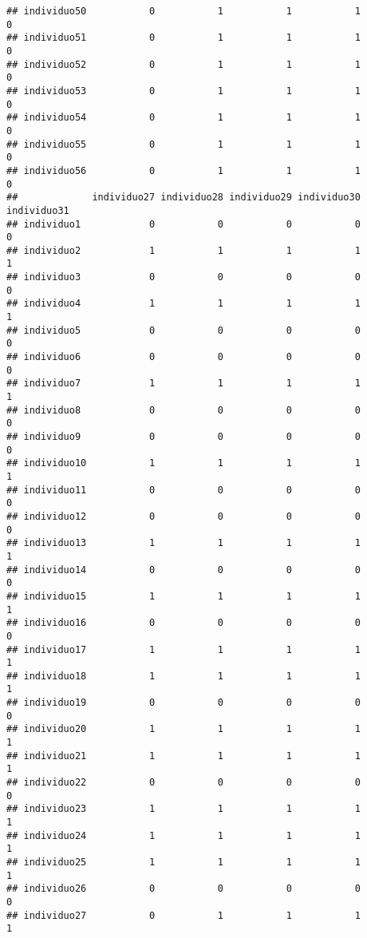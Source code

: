 \documentclass[
]{article}
\begin{document}
\begin{verbatim}
## individuo50           0           1           1           1           0
## individuo51           0           1           1           1           0
## individuo52           0           1           1           1           0
## individuo53           0           1           1           1           0
## individuo54           0           1           1           1           0
## individuo55           0           1           1           1           0
## individuo56           0           1           1           1           0
##             individuo27 individuo28 individuo29 individuo30 individuo31
## individuo1            0           0           0           0           0
## individuo2            1           1           1           1           1
## individuo3            0           0           0           0           0
## individuo4            1           1           1           1           1
## individuo5            0           0           0           0           0
## individuo6            0           0           0           0           0
## individuo7            1           1           1           1           1
## individuo8            0           0           0           0           0
## individuo9            0           0           0           0           0
## individuo10           1           1           1           1           1
## individuo11           0           0           0           0           0
## individuo12           0           0           0           0           0
## individuo13           1           1           1           1           1
## individuo14           0           0           0           0           0
## individuo15           1           1           1           1           1
## individuo16           0           0           0           0           0
## individuo17           1           1           1           1           1
## individuo18           1           1           1           1           1
## individuo19           0           0           0           0           0
## individuo20           1           1           1           1           1
## individuo21           1           1           1           1           1
## individuo22           0           0           0           0           0
## individuo23           1           1           1           1           1
## individuo24           1           1           1           1           1
## individuo25           1           1           1           1           1
## individuo26           0           0           0           0           0
## individuo27           0           1           1           1           1

\end{verbatim}
\end{document}
